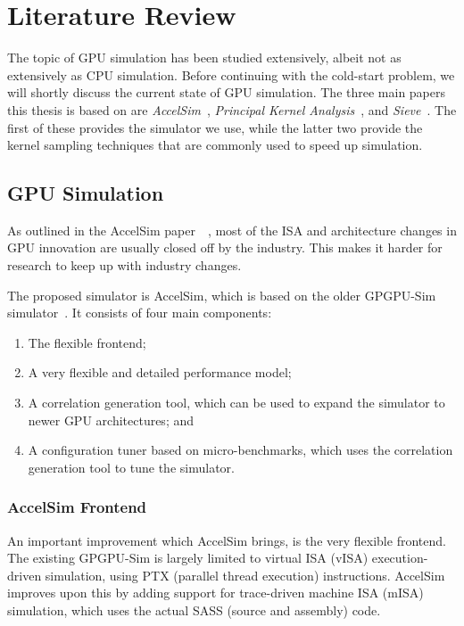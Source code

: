 \chapter{Literature Review}\label{ch:literature-review}
The topic of GPU simulation has been studied extensively, albeit not as extensively as CPU simulation.
Before continuing with the cold-start problem, we will shortly discuss the current state of GPU simulation.
The three main papers this thesis is based on are \textit{AccelSim}~\cite{accelsim}, \textit{Principal Kernel Analysis}~\cite{pks}, and \textit{Sieve}~\cite{sieve}.
The first of these provides the simulator we use, while the latter two provide the kernel sampling techniques that are commonly used to speed up simulation.

\section{GPU Simulation}\label{sec:gpu-simulation}
As outlined in the AccelSim paper\ ~\cite{accelsim}, most of the ISA and architecture changes in GPU innovation are usually closed off by the industry.
This makes it harder for research to keep up with industry changes.

The proposed simulator is AccelSim, which is based on the older GPGPU-Sim simulator~\cite{gpgpu-sim}.
It consists of four main components:
\begin{enumerate}
    \item The flexible frontend;
    \item A very flexible and detailed performance model;
    \item A correlation generation tool, which can be used to expand the simulator to newer GPU architectures; and
    \item A configuration tuner based on micro-benchmarks, which uses the correlation generation tool to tune the simulator.
\end{enumerate}


\subsection{AccelSim Frontend}\label{subsec:accelsim-frontend}
An important improvement which AccelSim brings, is the very flexible frontend.
The existing GPGPU-Sim is largely limited to virtual ISA (vISA) execution-driven simulation, using PTX (parallel thread execution) instructions.
AccelSim improves upon this by adding support for trace-driven machine ISA (mISA) simulation, which uses the actual SASS (source and assembly) code.

